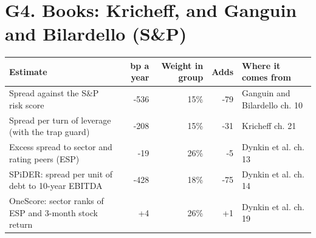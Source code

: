 \documentclass[11pt,a4paper]{article}
\begin{document}
\section*{G4. Books: Kricheff, and Ganguin and Bilardello (S\&P)}
\par\noindent{}
\begin{center}\footnotesize\setlength{\tabcolsep}{3.5pt}\begin{tabular}{@{}p{6.2cm}rrrp{4.2cm}@{}}\toprule
Estimate & bp a year & Weight in group & Adds & Where it comes from \\\midrule
Spread against the S\&P risk score & -536 & 15\% & -79 & Ganguin and Bilardello ch. 10 \\
Spread per turn of leverage (with the trap guard) & -208 & 15\% & -31 & Kricheff ch. 21 \\
Excess spread to sector and rating peers (ESP) & -19 & 26\% & -5 & Dynkin et al. ch. 13 \\
SPiDER: spread per unit of debt to 10-year EBITDA & -428 & 18\% & -75 & Dynkin et al. ch. 14 \\
OneScore: sector ranks of ESP and 3-month stock return & +4 & 26\% & +1 & Dynkin et al. ch. 19 \\
\bottomrule\end{tabular}\end{center}
\end{document}
